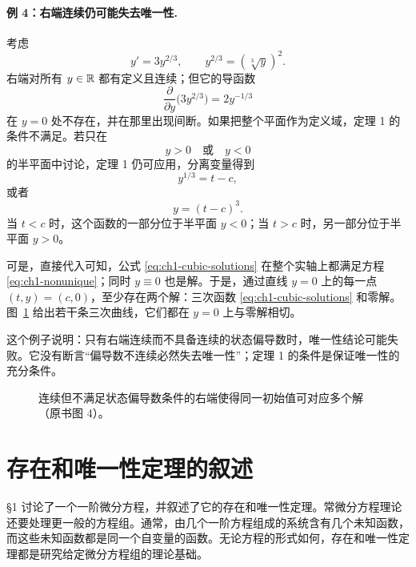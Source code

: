 \paragraph{例 4：右端连续仍可能失去唯一性.}
考虑
\begin{equation}
 y'=3y^{2/3},
 \qquad
 y^{2/3}=(\sqrt[3]{y})^2.
 \label{eq:ch1-nonunique}
\end{equation}
右端对所有 \(y\in\mathbb R\) 都有定义且连续；但它的导函数
\[
 \frac{\partial}{\partial y}\bigl(3y^{2/3}\bigr)=2y^{-1/3}
\]
在 \(y=0\) 处不存在，并在那里出现间断。如果把整个平面作为定义域，定理 1 的条件不满足。若只在
\[
 y>0\quad\text{或}\quad y<0
\]
的半平面中讨论，定理 1 仍可应用，分离变量得到
\[
 y^{1/3}=t-c,
\]
或者
\begin{equation}
 y=(t-c)^3.
 \label{eq:ch1-cubic-solutions}
 \end{equation}
当 \(t<c\) 时，这个函数的一部分位于半平面 \(y<0\)；当 \(t>c\) 时，另一部分位于半平面 \(y>0\)。

可是，直接代入可知，公式 \eqref{eq:ch1-cubic-solutions} 在整个实轴上都满足方程 \eqref{eq:ch1-nonunique}；同时 \(y\equiv0\) 也是解。于是，通过直线 \(y=0\) 上的每一点 \((t,y)=(c,0)\)，至少存在两个解：三次函数 \eqref{eq:ch1-cubic-solutions} 和零解。图~\ref{fig:ch1-nonunique} 给出若干条三次曲线，它们都在 \(y=0\) 上与零解相切。

这个例子说明：只有右端连续而不具备连续的状态偏导数时，唯一性结论可能失败。它没有断言“偏导数不连续必然失去唯一性”；定理 1 的条件是保证唯一性的充分条件。

\begin{figure}[H]
 \centering
 \resizebox{0.62\textwidth}{!}{}
 \caption{连续但不满足状态偏导数条件的右端使得同一初始值可对应多个解（原书图 4）。}
 \label{fig:ch1-nonunique}
\end{figure}

\section{存在和唯一性定理的叙述}

§1 讨论了一个一阶微分方程，并叙述了它的存在和唯一性定理。常微分方程理论还要处理更一般的方程组。通常，由几个一阶方程组成的系统含有几个未知函数，而这些未知函数都是同一个自变量的函数。无论方程的形式如何，存在和唯一性定理都是研究给定微分方程组的理论基础。

